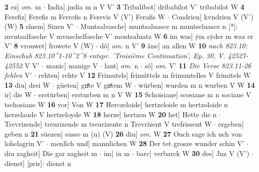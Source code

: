 \documentclass[8pt,a4paper,notitlepage]{article}
\begin{document}
\begin{table}[ht]
\begin{minipage}[t]{0.5\linewidth}
\textbf{2} ez] \textit{om.} m  $\cdot$ India] jndia m n V V' \textbf{3} Tribalibot] dribabilot V' tribabilot W \textbf{4} Ferefiz] Ferefis m Ferrefis n Ferevis V (V') Ferafis W  $\cdot$ Condrien] kvndrien V (V') (W) \textbf{5} sînem] Sinen V'  $\cdot$ Muntsalvasche] muntsaluasce m muntseluasce n [*]: mvntsalfasche V mvnschelfasche V' montsaluatz W \textbf{6} im was] ẏm sẏder m waz er V' \textbf{8} vrouwet] frowete V (W)  $\cdot$ dô] \textit{om.} n V' \textbf{9} âne] an allen W \textbf{10} \textit{nach 823.10: Einschub 823.10\textasciicircum1-10\textasciicircum2\textasciicircum8 entspr. 'Troisième Continuation', Ep. 30, V. 42527-42552} V V'   $\cdot$ manic] manige V  $\cdot$ lant] \textit{om.} n  $\cdot$ sô] \textit{om.} V' \textbf{11} \textit{Die Verse 823.11-26 fehlen} V'   $\cdot$ rehten] rehte V \textbf{12} Frimutels] frimúttels m frimuntelles V frimitels W \textbf{13} diu] drei W  $\cdot$ güeten] guͤte V guͦtem W  $\cdot$ würben] wurden m n wurben V W \textbf{14} ir] die W  $\cdot$ erstürben] ersturben m n V W \textbf{15} Schoisiane] scosiane m n sociane V tschosiane W \textbf{16} vor] Von W \textbf{17} Herczeloide] hertzeloide m hertzoloide n herzelaude V hertzeloyde W \textbf{18} herze] hertzen W \textbf{20} het] Hette die n  $\cdot$ Trevrizende] treurizende m treurizente n Trevrizent V trefrissent W  $\cdot$ ergeben] geben n \textbf{21} süezen] susse m (n) (V) \textbf{26} diu] \textit{om.} W \textbf{27} Ouch sage ich uch von lohelagrin V'  $\cdot$ menlîch und] mannlichen W \textbf{28} Der tet grosze wunder schin V'  $\cdot$ diu zagheit] Die gar zagheit m  $\cdot$ im] in m  $\cdot$ barc] verbarck W \textbf{30} des] Jnz V (V')  $\cdot$ dienst] [pris]: dienst n \newline
\end{minipage}
\end{table}
\newpage
\end{document}
